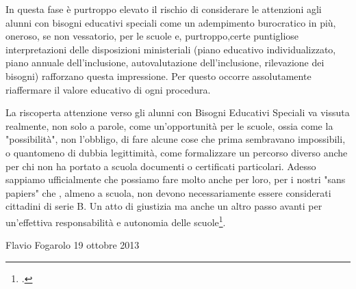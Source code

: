 In questa fase è purtroppo elevato il rischio di considerare le attenzioni agli alunni con bisogni educativi speciali come un adempimento burocratico in più, oneroso, se non vessatorio, per le scuole e, purtroppo,certe puntigliose interpretazioni delle disposizioni ministeriali (piano educativo individualizzato, piano annuale dell'inclusione, autovalutazione dell'inclusione, rilevazione dei bisogni) rafforzano questa impressione. Per questo occorre assolutamente riaffermare il valore educativo di ogni procedura.

La riscoperta attenzione verso gli alunni con Bisogni Educativi Speciali va vissuta realmente, non solo a parole, come un'opportunità per le scuole, ossia come la "possibilità", non l'obbligo, di fare alcune cose che prima sembravano impossibili, o quantomeno di dubbia legittimità, come formalizzare un percorso diverso anche per chi non ha portato a scuola documenti o certificati particolari. Adesso sappiamo ufficialmente che possiamo fare molto anche per loro, per i nostri "sans papiers" che , almeno a scuola, non devono necessariamente essere considerati cittadini di serie B. Un atto di giustizia ma anche un altro passo avanti per un'effettiva responsabilità e autonomia delle scuole\footcite{Fogarolo2013}. 


Flavio Fogarolo
19 ottobre 2013